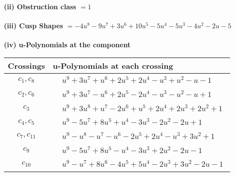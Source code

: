 \documentclass[1p]{elsarticle_modified}
\theoremstyle{definition}
\begin{document}
\flushleft \textbf{(ii) Obstruction class $= 1$}\\~\\
\flushleft \textbf{(iii) Cusp Shapes $= -4 u^8-9 u^7+3 u^6+10 u^5-5 u^4-5 u^3-4 u^2-2 u-5$}\\~\\
\newpage\renewcommand{\arraystretch}{1}
\flushleft \textbf{(iv) u-Polynomials at the component}\newline \\
\begin{tabular}{m{50pt}|m{274pt}}
Crossings & \hspace{64pt}u-Polynomials at each crossing \\
\hline $$\begin{aligned}c_{1},c_{8}\end{aligned}$$&$\begin{aligned}
&u^9+3 u^7+u^6+2 u^5+2 u^4- u^3+u^2- u-1
\end{aligned}$\\
\hline $$\begin{aligned}c_{2},c_{6}\end{aligned}$$&$\begin{aligned}
&u^9+3 u^7- u^6+2 u^5-2 u^4- u^3- u^2- u+1
\end{aligned}$\\
\hline $$\begin{aligned}c_{3}\end{aligned}$$&$\begin{aligned}
&u^9+3 u^8+u^7-2 u^6+u^5+2 u^4+2 u^3+2 u^2+1
\end{aligned}$\\
\hline $$\begin{aligned}c_{4},c_{5}\end{aligned}$$&$\begin{aligned}
&u^9-5 u^7+8 u^5+u^4-3 u^3-2 u^2-2 u+1
\end{aligned}$\\
\hline $$\begin{aligned}c_{7},c_{11}\end{aligned}$$&$\begin{aligned}
&u^9- u^8- u^7- u^6-2 u^5+2 u^4- u^3+3 u^2+1
\end{aligned}$\\
\hline $$\begin{aligned}c_{9}\end{aligned}$$&$\begin{aligned}
&u^9-5 u^7+8 u^5- u^4-3 u^3+2 u^2-2 u-1
\end{aligned}$\\
\hline $$\begin{aligned}c_{10}\end{aligned}$$&$\begin{aligned}
&u^9- u^7+8 u^6-4 u^5+5 u^4-2 u^3+3 u^2-2 u-1
\end{aligned}$\\
\hline
\end{tabular}\\~\\
\end{document}
